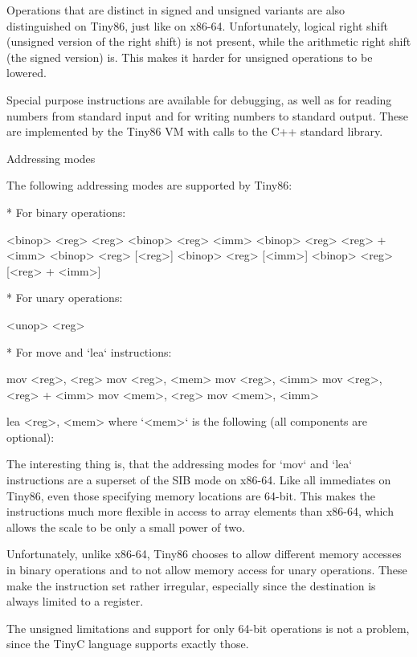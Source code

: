 Operations that are distinct in signed and unsigned variants are also
distinguished on Tiny86, just like on x86-64. Unfortunately, logical right shift
(unsigned version of the right shift) is not present, while the arithmetic right
shift (the signed version) is. This makes it harder for unsigned operations to
be lowered.

Special purpose instructions are available for debugging, as well as for reading
numbers from standard input and for writing numbers to standard output. These
are implemented by the Tiny86 VM with calls to the C++ standard library.

\secc Addressing modes

The following addressing modes are supported by Tiny86:

\begitems

* For binary operations:

\begtt \optparams
<binop> <reg> <reg>
<binop> <reg> <imm>
<binop> <reg> <reg> + <imm>
<binop> <reg> [<reg>]
<binop> <reg> [<imm>]
<binop> <reg> [<reg> + <imm>]
\endtt

* For unary operations:

\begtt \optparams
<unop> <reg>
\endtt

* For move and `lea` instructions:

\begtt \optparams
mov <reg>, <reg>
mov <reg>, <mem>
mov <reg>, <imm>
mov <reg>, <reg> + <imm>
mov <mem>, <reg>
mov <mem>, <imm>

lea <reg>, <mem>
\endtt
%
where `<mem>` is the following (all components are optional):

\begtt {}
\endtt

\enditems

The interesting thing is, that the addressing modes for `mov` and `lea`
instructions are a superset of the SIB mode on x86-64. Like all immediates on
Tiny86, even those specifying memory locations are 64-bit. This makes the
instructions much
more flexible in access to array elements than x86-64, which allows the scale
to be only a small power of two.

Unfortunately, unlike x86-64, Tiny86 chooses to allow different memory accesses
in binary operations and to not allow memory access for unary operations. These
make the instruction set rather irregular, especially since the destination is
always limited to a register.

The unsigned limitations and support for only 64-bit operations is not a
problem, since the TinyC language supports exactly those.

